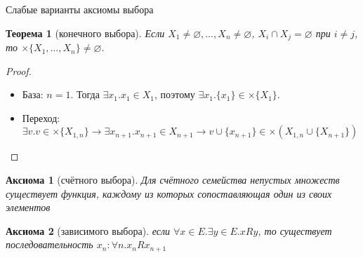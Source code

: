 \documentclass[aspectratio=169]{beamer}
\newtheorem{thm}{Теорема}[section]
\newtheorem{axm}{Аксиома}[section]
\begin{document}
\begin{frame}{Слабые варианты аксиомы выбора}

\begin{thm}[конечного выбора]
Если $X_1\ne\varnothing, \dots, X_n\ne\varnothing$, $X_i\cap X_j = \varnothing$ при $i \ne j$, то $\times \{X_1, \dots, X_n\} \ne \varnothing$.
\end{thm}

\begin{proof}
\begin{itemize}\item База: $n=1$. Тогда $\exists x_1.x_1 \in X_1$, поэтому $\exists x_1.\{x_1\} \in \times \{X_1\}$.

\item Переход: %
$\exists v.v \in \times \{X_{1,n}\}\rightarrow\exists x_{n+1}.x_{n+1} \in X_{n+1}\rightarrow
v \cup \{x_{n+1}\} \in \times (X_{1,n}\cup\{X_{n+1}\})$
\end{itemize}\vspace{-0.3cm}\end{proof}




\begin{axm}[счётного выбора]
Для счётного семейства непустых множеств существует функция, каждому из которых сопоставляющая один из своих элементов
\end{axm}

\begin{axm}[зависимого выбора]
если $\forall x \in E.\exists y \in E. x R y$, то существует последовательность $x_n: \forall n.x_n R x_{n+1}$
\end{axm}
\end{frame}
\end{document}
